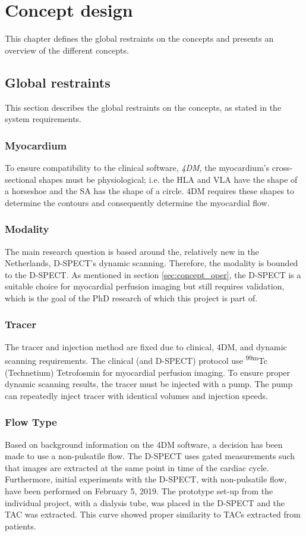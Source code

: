 \chapter{Concept design}
This chapter defines the global restraints on the concepts and presents an overview of the different concepts.

\section{Global restraints}
This section describes the global restraints on the concepts, as stated in the system requirements. 
\subsection{Myocardium}
\label{sec:myocardium}
To ensure compatibility to the clinical software, \textit{4DM}, the myocardium's cross-sectional shapes must be physiological; i.e. the \ac{HLA} and \ac{VLA} have the shape of a horseshoe and the \ac{SA} has the shape of a circle. 4DM requires these shapes to determine the contours and consequently determine the myocardial flow.
\subsection{Modality}
\label{sec:modality}
The main research question is based around the, relatively new in the Netherlands, D-SPECT's dynamic scanning. Therefore, the modality is bounded to the D-SPECT. As mentioned in section \ref{sec:concept_oper}, the D-SPECT is a suitable choice for myocardial perfusion imaging but still requires validation, which is the goal of the PhD research of which this project is part of.
\subsection{Tracer}
\label{sec:tracer}
The tracer and injection method are fixed due to clinical, 4DM, and dynamic scanning requirements. The clinical (and D-SPECT) protocol use \textsuperscript{99m}Tc (Technetium) Tetrofosmin for myocardial perfusion imaging. To ensure proper dynamic scanning results, the tracer must be injected with a pump. The pump can repeatedly inject tracer with identical volumes and injection speeds.
\subsection{Flow Type}
\label{sec:flowType}
Based on background information on the 4DM software, a decision has been made to use a non-pulsatile flow. The D-SPECT uses gated measurements such that images are extracted at the same point in time of the cardiac cycle. Furthermore, initial experiments with the D-SPECT, with non-pulsatile flow, have been performed on February 5, 2019. The prototype set-up from the individual project, with a dialysis tube, was placed in the D-SPECT and the TAC was extracted. This curve showed proper similarity to TACs extracted from patients.
